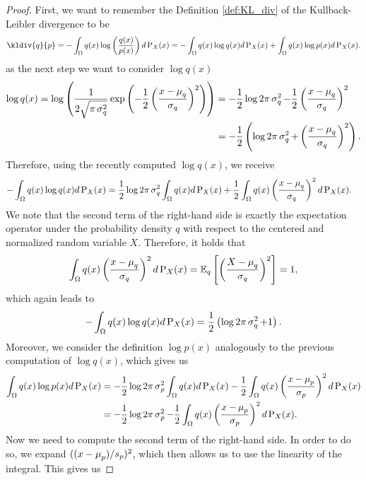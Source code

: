 \begin{proof}
First, we want to remember the Definition \ref{def:KL_div} of the Kullback-Leibler divergence to be
\begin{align*}
\kldiv{q}{p} = - \int_{\O} q(x) \log \left(\frac{q(x)}{p(x)} \right) d\prob_X(x) = - \int_{\O} q(x) \log q(x) d\prob_X(x) + \int_{\O} q(x) \log p(x) d\prob_X(x).
\end{align*}
as the next step we want to consider $\log q(x)$
\begin{align*}
\log q(x) = \log \left( \frac{1}{2\sqrt{\pi \operatorname{\sigma}_q^{2}}} \exp \left( -\frac{1}{2} \left( \frac{x - \operatorname{\mu}_{q}}{\operatorname{\sigma}_{q}} \right)^2 \right) \right) &= - \frac{1}{2}\log 2\pi \operatorname{\sigma}_q^{2} - \frac{1}{2} \left( \frac{x - \operatorname{\mu}_{q}}{\operatorname{\sigma}_{q}} \right)^2\\
&= -\frac{1}{2} \left( \log 2\pi \operatorname{\sigma}_q^{2} + \left( \frac{x - \operatorname{\mu}_{q}}{\operatorname{\sigma}_{q}} \right)^2\right).
\end{align*}
Therefore, using the recently computed $\log q(x)$, we receive
\begin{align*}
- \int_{\Omega} q(x) \log q(x) d\operatorname{\text{P}}_X(x) &= \frac{1}{2} \log 2\pi \operatorname{\sigma}_q^{2} \int_{\Omega} q(x) d\operatorname{\text{P}}_X(x) + \frac{1}{2}\int_{\Omega} q(x) \left( \frac{x - \operatorname{\mu}_{q}}{\operatorname{\sigma}_{q}} \right)^2 d\operatorname{\text{P}}_X(x).
\end{align*}
We note that the second term of the right-hand side is exactly the expectation operator under the probability density $q$ with respect to the centered and normalized random variable $X$. Therefore, it holds that
\begin{align*}
\int_{\Omega} q(x) \left( \frac{x - \operatorname{\mu}_{q}}{\operatorname{\sigma}_{q}} \right)^2 d\operatorname{\text{P}}_X(x) = \operatorname{\mathbb{E}}_{q} \left[\left( \frac{X - \operatorname{\mu}_q}{\operatorname{\sigma}_q} \right)^2 \right] = 1,
\end{align*}
which again leads to
\begin{align*}
- \int_{\Omega} q(x) \log q(x) d\operatorname{\text{P}}_X(x) = \frac{1}{2} \left(\log 2\pi \operatorname{\sigma}_q^{2} + 1\right).
\end{align*}
Moreover, we consider the definition $\log p(x)$ analogously to the previous computation of $\log q(x)$, which gives us
\begin{align*}
\int_{\Omega} q(x) \log p(x) d\operatorname{\text{P}}_X(x) &= - \frac{1}{2} \log 2\pi \operatorname{\sigma}_p^{2} \int_{\Omega} q(x) d\operatorname{\text{P}}_X(x) - \frac{1}{2}\int_{\Omega} q(x) \left( \frac{x - \operatorname{\mu}_{p}}{\operatorname{\sigma}_{p}} \right)^2 d\operatorname{\text{P}}_X(x)\\
&= - \frac{1}{2} \log 2\pi \operatorname{\sigma}_p^{2} - \frac{1}{2}\int_{\Omega} q(x) \left( \frac{x - \operatorname{\mu}_{p}}{\operatorname{\sigma}_{p}} \right)^2 d\operatorname{\text{P}}_X(x).
\end{align*}
Now we need to compute the second term of the right-hand side. In order to do so, we expand $((x- \operatorname{\mu}_p)/s_p)^2$, which then allows us to use the linearity of the integral. This gives us

\end{proof}

